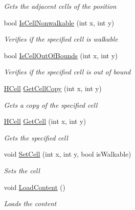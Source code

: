 \begin{DoxyCompactItemize}
\begin{DoxyCompactList}\small\item\em Gets the adjacent cells of the position \end{DoxyCompactList}\item 
bool \hyperlink{class_hel_project_1_1_game_world_1_1_map_1_1_h_map_a5bca0c19006ab0058c11ebe44c888df5}{Is\+Cell\+Nonwalkable} (int x, int y)
\begin{DoxyCompactList}\small\item\em Verifies if the specified cell is walkable \end{DoxyCompactList}\item 
bool \hyperlink{class_hel_project_1_1_game_world_1_1_map_1_1_h_map_a1e2dbc41db3641f79cfcd8b319e5378d}{Is\+Cell\+Out\+Of\+Bounds} (int x, int y)
\begin{DoxyCompactList}\small\item\em Verifies if the specified cell is out of bound \end{DoxyCompactList}\item 
\hyperlink{class_hel_project_1_1_game_world_1_1_map_1_1_h_cell}{H\+Cell} \hyperlink{class_hel_project_1_1_game_world_1_1_map_1_1_h_map_abe9c8579ffe3a57f460254405202e417}{Get\+Cell\+Copy} (int x, int y)
\begin{DoxyCompactList}\small\item\em Gets a copy of the specified cell \end{DoxyCompactList}\item 
\hyperlink{class_hel_project_1_1_game_world_1_1_map_1_1_h_cell}{H\+Cell} \hyperlink{class_hel_project_1_1_game_world_1_1_map_1_1_h_map_add08dfb4ddb7dec19bd52684e6051da2}{Get\+Cell} (int x, int y)
\begin{DoxyCompactList}\small\item\em Gets the specified cell \end{DoxyCompactList}\item 
void \hyperlink{class_hel_project_1_1_game_world_1_1_map_1_1_h_map_ac2ef04c6930b46bea691379183ca57f4}{Set\+Cell} (int x, int y, bool is\+Walkable)
\begin{DoxyCompactList}\small\item\em Sets the cell \end{DoxyCompactList}\item 
void \hyperlink{class_hel_project_1_1_game_world_1_1_map_1_1_h_map_aba4e4fe6ef1061980b0899b5bdf9a288}{Load\+Content} ()
\begin{DoxyCompactList}\small\item\em Loads the content \end{DoxyCompactList}\item 

\end{DoxyCompactItemize}
